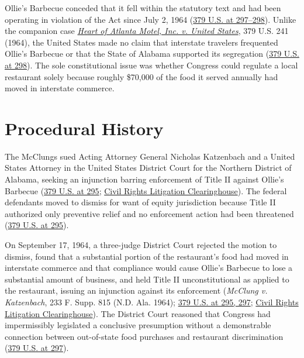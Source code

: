 \documentclass[12pt]{article}
\begin{document}
Ollie's Barbecue conceded that it fell within the statutory text and had been operating in violation of the Act since July 2, 1964 (\href{https://supreme.justia.com/cases/federal/us/379/294/}{379 U.S. at 297--298}). Unlike the companion case \href{https://supreme.justia.com/cases/federal/us/379/241/}{\textit{Heart of Atlanta Motel, Inc. v. United States}}, 379 U.S. 241 (1964), the United States made no claim that interstate travelers frequented Ollie's Barbecue or that the State of Alabama supported its segregation (\href{https://supreme.justia.com/cases/federal/us/379/294/}{379 U.S. at 298}). The sole constitutional issue was whether Congress could regulate a local restaurant solely because roughly \$70,000 of the food it served annually had moved in interstate commerce.

\section{Procedural History}

The McClungs sued Acting Attorney General Nicholas Katzenbach and a United States Attorney in the United States District Court for the Northern District of Alabama, seeking an injunction barring enforcement of Title II against Ollie's Barbecue (\href{https://supreme.justia.com/cases/federal/us/379/294/}{379 U.S. at 295}; \href{https://clearinghouse.net/case/11136/}{Civil Rights Litigation Clearinghouse}). The federal defendants moved to dismiss for want of equity jurisdiction because Title II authorized only preventive relief and no enforcement action had been threatened (\href{https://supreme.justia.com/cases/federal/us/379/294/}{379 U.S. at 295}).

On September 17, 1964, a three-judge District Court rejected the motion to dismiss, found that a substantial portion of the restaurant's food had moved in interstate commerce and that compliance would cause Ollie's Barbecue to lose a substantial amount of business, and held Title II unconstitutional as applied to the restaurant, issuing an injunction against its enforcement (\textit{McClung v. Katzenbach}, 233 F. Supp. 815 (N.D. Ala. 1964); \href{https://supreme.justia.com/cases/federal/us/379/294/}{379 U.S. at 295, 297}; \href{https://clearinghouse.net/case/11136/}{Civil Rights Litigation Clearinghouse}). The District Court reasoned that Congress had impermissibly legislated a conclusive presumption without a demonstrable connection between out-of-state food purchases and restaurant discrimination (\href{https://supreme.justia.com/cases/federal/us/379/294/}{379 U.S. at 297}).
\end{document}
